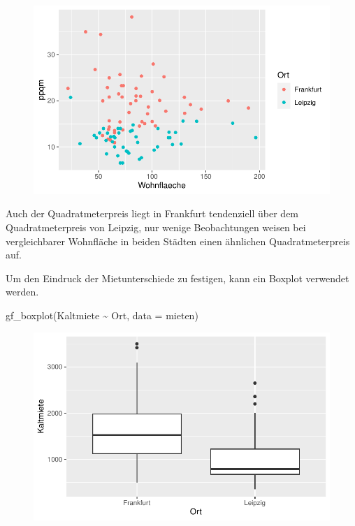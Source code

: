 \documentclass[
  a4paper,
  DIV=11]{scrartcl}
\newenvironment{Shaded}{\begin{snugshade}}{\end{snugshade}}
\newcommand{\AttributeTok}[1]{\textcolor[rgb]{0.40,0.45,0.13}{#1}}
\newcommand{\FunctionTok}[1]{\textcolor[rgb]{0.28,0.35,0.67}{#1}}
\newcommand{\NormalTok}[1]{\textcolor[rgb]{0.00,0.23,0.31}{#1}}
\newcommand{\SpecialCharTok}[1]{\textcolor[rgb]{0.37,0.37,0.37}{#1}}
\begin{document}
\begin{figure}[H]

{\centering \includegraphics{Mietmodellierung_files/figure-pdf/unnamed-chunk-9-1.pdf}

}

\end{figure}

Auch der Quadratmeterpreis liegt in Frankfurt tendenziell über dem
Quadratmeterpreis von Leipzig, nur wenige Beobachtungen weisen bei
vergleichbarer Wohnfläche in beiden Städten einen ähnlichen
Quadratmeterpreis auf.

Um den Eindruck der Mietunterschiede zu festigen, kann ein Boxplot
verwendet werden.

\begin{Shaded}
\begin{Highlighting}[]
\FunctionTok{gf\_boxplot}\NormalTok{(Kaltmiete }\SpecialCharTok{\textasciitilde{}}\NormalTok{ Ort, }\AttributeTok{data =}\NormalTok{ mieten)}
\end{Highlighting}
\end{Shaded}

\begin{figure}[H]

{\centering \includegraphics{Mietmodellierung_files/figure-pdf/unnamed-chunk-10-1.pdf}

}

\end{figure}
\end{document}
